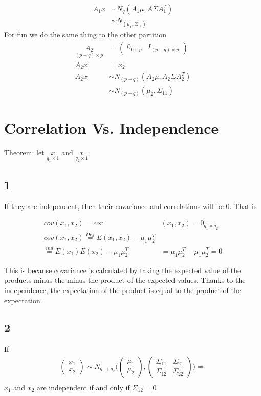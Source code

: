 \begin{align*}
    A_1x &\sim N_q(A_1\mu,A\Sigma A_1^T)\\
    &\sim N_(\mu_1,\Sigma_{11})
\end{align*}
For fun we do the same thing to the other partition
\begin{align*}
    \underset{(p-q)\times p}{A_2} &= \begin{pmatrix}
    0_{0\times p} & I_{(p-q)\times p}
    \end{pmatrix} \\
    A_2x &= x_2\\
    A_2x &\sim N_{(p-q)}(A_2\mu,A_2\Sigma A_2^T)\\
    &\sim N_{(p-q)}(\mu_2,\Sigma_{11})
\end{align*}

\section{Correlation Vs. Independence}

Theorem: let $\underset{q_1 \times 1}{x}$ and $\underset{q_2 \times 1}{x}$. 

\subsection*{1} If they are independent, then their covariance and correlations will be 0. That is

\begin{align*}
    cov(x_1,x_2) = cor&(x_1,x_2) = 0_{q_1 \times q_2} \\
    cov(x_1,x_2) \overset{Def}{=}E(x_1,x_2) - \mu_1\mu_2^T \\
    \overset{ind}{=} E(x_1)E(x_2)- \mu_1\mu_2^T &= \mu_1\mu_2^T-\mu_1\mu_2^T=0
\end{align*}

This is because covariance is calculated by taking the expected value of the products minus the minus the product of the expected values. Thanks to the independence, the expectation of the product is equal to the product of the expectation.

\subsection*{2}
If \begin{align*}
    \begin{pmatrix}
    x_1 \\
    x_2
    \end{pmatrix} \sim N_{q_1+q_2} \Bigg(  
    \begin{pmatrix}
    \mu_1 \\
    \mu_2
    \end{pmatrix} ,
    \begin{pmatrix}
    \Sigma_{11} & \Sigma_{21} \\
    \Sigma_{12} & \Sigma_{22}
    \end{pmatrix}
    \Bigg) \Rightarrow \\
\end{align*}
$x_1$ and $x_2$ are independent if and only if $\Sigma_{12}=0$

